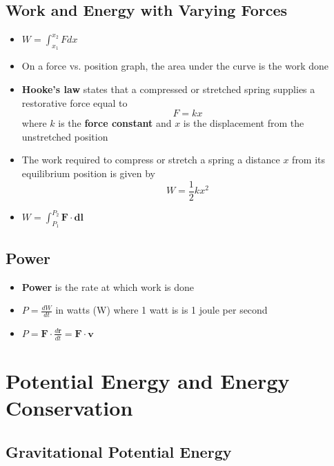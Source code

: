 \documentclass{article}
\begin{document}
\subsection{Work and Energy with Varying Forces}

\begin{itemize}
    \item $W=\int_{x_1}^{x_2}F dx$

    \item On a force vs. position graph, the area under the curve is the work done

    \item \textbf{Hooke's law} states that a compressed or stretched spring supplies a restorative force equal to \[F=kx\] where $k$ is the \textbf{force constant} and $x$ is the displacement from the unstretched position

    \item The work required to compress or stretch a spring a distance $x$ from its equilibrium position is given by \[W=\frac{1}{2}kx^2\]

    \item $W=\int_{P_1}^{P_2}\textbf{F}\cdot\textbf{dl}$
\end{itemize}

\subsection{Power}

\begin{itemize}
    \item \textbf{Power} is the rate at which work is done

    \item $P=\frac{dW}{dt}$ in watts (W) where 1 watt is is 1 joule per second

    \item $P=\mathbf{F}\cdot\frac{d\mathbf{r}}{dt}=\mathbf{F}\cdot\mathbf{v}$
\end{itemize}

\section{Potential Energy and Energy Conservation}

\subsection{Gravitational Potential Energy}
\end{document}
